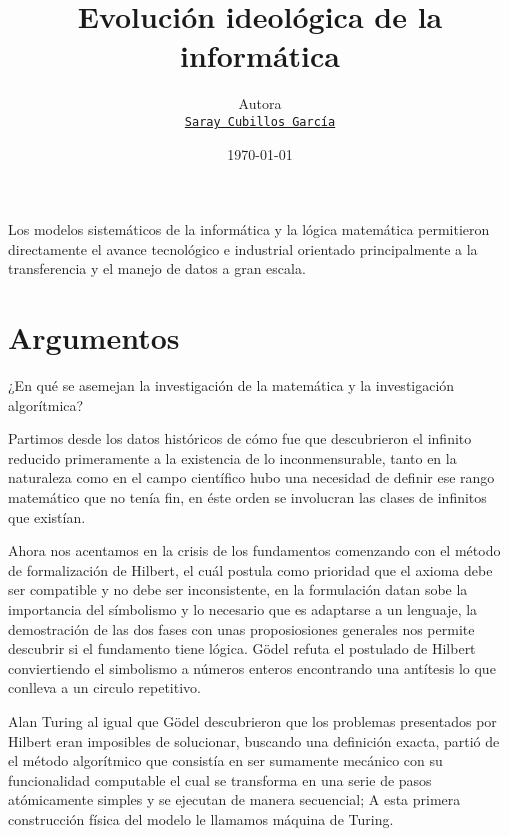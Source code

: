 \documentclass[11pt]{article}
\title{Evolución ideológica de la informática}
\author{Autora\\%
    \href{mailto:saray.cubillos@udea.edu.co}{\texttt{Saray Cubillos García}} %
    }
\date{\today}
\begin{document}
{
\maketitle

Los modelos sistemáticos de la informática y la lógica matemática permitieron directamente el avance tecnológico e industrial  orientado principalmente a la transferencia y el manejo de datos a gran escala.

\noindent
\noindent

}



\section{Argumentos}

¿En qué se asemejan la investigación de la matemática y la investigación algorítmica?

Partimos desde los datos históricos de cómo fue que descubrieron el infinito reducido primeramente a la existencia de lo inconmensurable, tanto en la naturaleza como en el campo científico hubo una necesidad de definir ese rango matemático que no tenía fin, en éste orden se involucran las clases de infinitos que existían.

Ahora nos acentamos en la crisis de los fundamentos comenzando con el método de formalización de Hilbert, el cuál postula como prioridad que el axioma debe ser compatible y no debe ser inconsistente, en la formulación datan sobe la importancia del símbolismo y lo necesario que es adaptarse a un lenguaje, la demostración de las dos fases con unas proposiosiones generales  nos permite descubrir si el fundamento tiene lógica.
Gödel refuta el postulado de Hilbert conviertiendo el simbolismo a números enteros encontrando una antítesis lo que conlleva a un circulo repetitivo.

Alan Turing al igual que Gödel descubrieron que los problemas presentados por Hilbert eran imposibles de solucionar, buscando una definición exacta, partió de el método algorítmico que consistía en ser sumamente mecánico con su funcionalidad computable el cual se transforma en una serie de pasos atómicamente simples y se ejecutan de manera secuencial; A esta primera construcción física del modelo le llamamos máquina de Turing.
\end{document}
